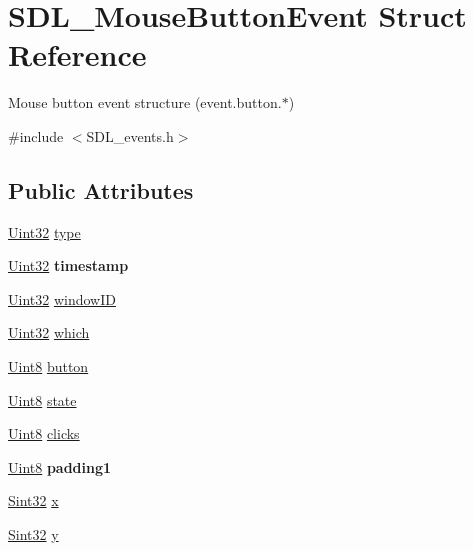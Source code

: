 \hypertarget{struct_s_d_l___mouse_button_event}{}\section{S\+D\+L\+\_\+\+Mouse\+Button\+Event Struct Reference}
\label{struct_s_d_l___mouse_button_event}


Mouse button event structure (event.\+button.$\ast$)  




{\ttfamily \#include $<$S\+D\+L\+\_\+events.\+h$>$}

\subsection*{Public Attributes}
\begin{DoxyCompactItemize}
\item 
\hyperlink{_s_d_l__stdinc_8h_add440eff171ea5f55cb00c4a9ab8672d}{Uint32} \hyperlink{struct_s_d_l___mouse_button_event_af64cb09ea68b8081ecc8ee498552e3d7}{type}
\item 
\hypertarget{struct_s_d_l___mouse_button_event_ab05e8a454692608ff56c502e95799c56}{}\hyperlink{_s_d_l__stdinc_8h_add440eff171ea5f55cb00c4a9ab8672d}{Uint32} {\bfseries timestamp}\label{struct_s_d_l___mouse_button_event_ab05e8a454692608ff56c502e95799c56}

\item 
\hyperlink{_s_d_l__stdinc_8h_add440eff171ea5f55cb00c4a9ab8672d}{Uint32} \hyperlink{struct_s_d_l___mouse_button_event_ab3b855d4b543b5d02fcf5d56e4421393}{window\+I\+D}
\item 
\hyperlink{_s_d_l__stdinc_8h_add440eff171ea5f55cb00c4a9ab8672d}{Uint32} \hyperlink{struct_s_d_l___mouse_button_event_a366aef59a0f393afc8a3561e741825df}{which}
\item 
\hyperlink{_s_d_l__stdinc_8h_a2944638813a090aa23e62f4da842c3e2}{Uint8} \hyperlink{struct_s_d_l___mouse_button_event_a1a4680e19ae06d02d2093f0bcba1b24c}{button}
\item 
\hyperlink{_s_d_l__stdinc_8h_a2944638813a090aa23e62f4da842c3e2}{Uint8} \hyperlink{struct_s_d_l___mouse_button_event_a8809cef85cfffad4f2059f2ba4fc6a3d}{state}
\item 
\hyperlink{_s_d_l__stdinc_8h_a2944638813a090aa23e62f4da842c3e2}{Uint8} \hyperlink{struct_s_d_l___mouse_button_event_aa606bebcbc3ffc7e932016039c2a36a1}{clicks}
\item 
\hypertarget{struct_s_d_l___mouse_button_event_a765957d218d16fa00558fa4d20e80689}{}\hyperlink{_s_d_l__stdinc_8h_a2944638813a090aa23e62f4da842c3e2}{Uint8} {\bfseries padding1}\label{struct_s_d_l___mouse_button_event_a765957d218d16fa00558fa4d20e80689}

\item 
\hyperlink{_s_d_l__stdinc_8h_a7a90b941db9d4582e9ad7abb9940ff7e}{Sint32} \hyperlink{struct_s_d_l___mouse_button_event_a5bb9c61b86e999f58637511e32e3a076}{x}
\item 
\hyperlink{_s_d_l__stdinc_8h_a7a90b941db9d4582e9ad7abb9940ff7e}{Sint32} \hyperlink{struct_s_d_l___mouse_button_event_a7ccb5c55a7ddadce723f4ea6d5269540}{y}
\end{DoxyCompactItemize}



